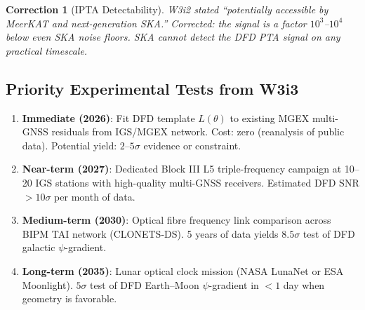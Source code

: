 \documentclass[aps,prd,twocolumn,superscriptaddress,nofootinbib]{revtex4-2}
\newtheorem{correction}{Correction}
\begin{document}
\begin{correction}[IPTA Detectability]
W3i2 stated ``potentially accessible by MeerKAT and next-generation SKA.''
Corrected: the signal is a factor $10^3$--$10^4$ below even SKA noise floors.
SKA cannot detect the DFD PTA signal on any practical timescale.
\end{correction}

\subsection{Priority Experimental Tests from W3i3}

\begin{enumerate}
\item \textbf{Immediate (2026)}: Fit DFD template $L(\theta)$ to
      existing MGEX multi-GNSS residuals from IGS/MGEX network.
      Cost: zero (reanalysis of public data). Potential yield: $2$--$5\sigma$
      evidence or constraint.

\item \textbf{Near-term (2027)}: Dedicated Block III L5 triple-frequency
      campaign at 10--20 IGS stations with high-quality multi-GNSS receivers.
      Estimated DFD SNR $> 10\sigma$ per month of data.

\item \textbf{Medium-term (2030)}: Optical fibre frequency link comparison
      across BIPM TAI network (CLONETS-DS). 5 years of data yields
      $8.5\sigma$ test of DFD galactic $\psi$-gradient.

\item \textbf{Long-term (2035)}: Lunar optical clock mission
      (NASA LunaNet or ESA Moonlight). $5\sigma$ test of DFD Earth--Moon
      $\psi$-gradient in $<1$ day when geometry is favorable.
\end{enumerate}
\end{document}
